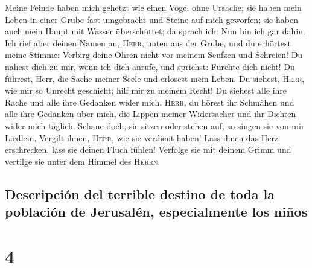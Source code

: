 Meine Feinde haben mich gehetzt wie einen Vogel ohne
Ursache;  sie haben mein Leben in einer Grube fast
umgebracht und Steine auf mich geworfen;  sie haben auch
mein Haupt mit Wasser überschüttet; da sprach ich: Nun bin ich gar
dahin.  Ich rief aber deinen Namen an, \textsc{Herr},
unten aus der Grube,  und du erhörtest meine Stimme:
Verbirg deine Ohren nicht vor meinem Seufzen und Schreien!
 Du nahest dich zu mir, wenn ich dich anrufe, und
sprichst: Fürchte dich nicht!  Du führest, Herr, die
Sache meiner Seele und erlösest mein Leben.  Du siehest,
\textsc{Herr}, wie mir so Unrecht geschieht; hilf mir zu meinem Recht!
 Du siehest alle ihre Rache und alle ihre Gedanken wider
mich.  \textsc{Herr}, du hörest ihr Schmähen und alle
ihre Gedanken über mich,  die Lippen meiner Widersacher
und ihr Dichten wider mich täglich.  Schaue doch, sie
sitzen oder stehen auf, so singen sie von mir Liedlein. 
Vergilt ihnen, \textsc{Herr}, wie sie verdient haben! 
Lass ihnen das Herz erschrecken, lass sie deinen Fluch fühlen!
 Verfolge sie mit deinem Grimm und vertilge sie unter dem
Himmel des \textsc{Herrn}.

\hypertarget{descripciuxf3n-del-terrible-destino-de-toda-la-poblaciuxf3n-de-jerusaluxe9n-especialmente-los-niuxf1os}{%
\subsection{Descripción del terrible destino de toda la población de
Jerusalén, especialmente los
niños}\label{descripciuxf3n-del-terrible-destino-de-toda-la-poblaciuxf3n-de-jerusaluxe9n-especialmente-los-niuxf1os}}

\hypertarget{section-3}{%
\section{4}\label{section-3}}

